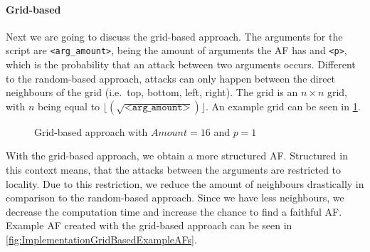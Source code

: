 \paragraph{Grid-based} Next we are going to discuss the grid-based approach. The arguments for the script are \texttt{<arg\_amount>}, being the amount of arguments the AF has and \texttt{<p>}, which is the probability that an attack between two arguments occurs. Different to the random-based approach, attacks can only happen between the direct neighbours of the grid (i.e.\ top, bottom, left, right). The grid is an $n \times n$ grid, with $n$ being equal to $\lfloor (\sqrt{\texttt{<arg\_amount>}}) \rfloor$. An example grid can be seen in \cref{fig:GridBasedApproach}.

\begin{figure}[h!]
    \centering
    \caption{Grid-based approach with $Amount=16$ and $p=1$}
    \label{fig:GridBasedApproach}
\end{figure}

With the grid-based approach, we obtain a more structured AF. Structured in this context means, that the attacks between the arguments are restricted to locality. Due to this restriction, we reduce the amount of neighbours drastically in comparison to the random-based approach. Since we have less neighbours, we decrease the computation time and increase the chance to find a faithful AF. Example AF created with the grid-based approach can be seen in \cref{fig:ImplementationGridBasedExampleAFs}.



